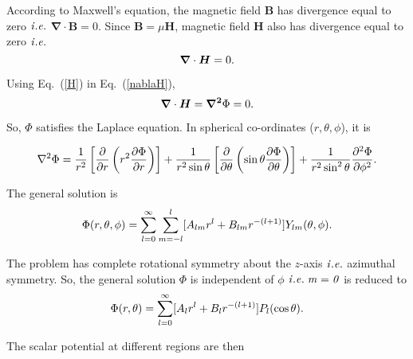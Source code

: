 According to Maxwell's equation, the magnetic field $\bm{B}$ has divergence equal to zero $\it{i.e.}$ \(\bm{\nabla}\cdot\bm{B}=0\). Since \(\bm{B}=\mu\bm{H}\), magnetic field $\bm{H}$ also has divergence equal to zero $\it{i.e.}$
\begin{equation}\label{nablaH}
\bm{\nabla}\cdot\bm{H}=0{\rm .}
\end{equation}

Using Eq.~(\ref{H}) in Eq.~(\ref{nablaH}),
\begin{equation}
\bm{\nabla}\cdot\bm{H}=\bm{\nabla^2}\Phi=0{\rm .}
\end{equation}


So, $\Phi$ satisfies the Laplace equation.  In spherical co-ordinates ($r, \theta, \phi$), it is

\begin{equation}
\nabla^2 \Phi=\frac{1}{r^2}\left[\frac{\partial }{\partial r} \left(r^2\frac{\partial \Phi}{\partial r}\right) \right]+ \frac{1}{r^2 \sin\theta}\left[\frac{\partial }{\partial \theta} \left(\sin\theta\frac{\partial \Phi}{\partial \theta}\right) \right]+ \frac{1}{r^2 \sin^2\theta}\frac{\partial^2 \Phi}{\partial \phi^2}{\rm .}
\end{equation}

The general solution is
\begin{equation}
\Phi(r,\theta, \phi)=\sum_{l=0}^{\infty}\sum_{m=-l}^l [A_{lm}r^l+B_{lm}r^{-(l+1)}]Y_{lm}(\theta, \phi){\rm .}
\end{equation}

The problem has complete rotational symmetry about the $z$-axis $\it{i.e.}$ azimuthal symmetry. So, the general solution $\Phi$ is independent of $\phi$ $\it{i.e.}\;m=0$ is reduced to
\begin{equation}
\Phi(r,\theta)=\sum_{l=0}^{\infty} [A_lr^l+B_lr^{-(l+1)}]P_l(\cos\theta){\rm .}
\end{equation}

The scalar potential at different regions are then 


